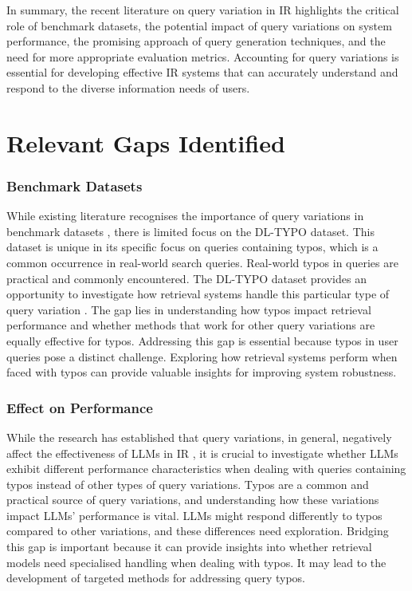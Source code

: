 In summary, the recent literature on query variation in IR highlights the critical role of benchmark datasets, the potential impact of query variations on system performance, the promising approach of query generation techniques, and the need for more appropriate evaluation metrics. Accounting for query variations is essential for developing effective IR systems that can accurately understand and respond to the diverse information needs of users.

\section{Relevant Gaps Identified}
\subsubsection{Benchmark Datasets}
While existing literature recognises the importance of query variations in benchmark datasets \cite{penha2022, zendel, lu}, there is limited focus on the DL-TYPO dataset. This dataset is unique in its specific focus on queries containing typos, which is a common occurrence in real-world search queries.
Real-world typos in queries are practical and commonly encountered. The DL-TYPO dataset provides an opportunity to investigate how retrieval systems handle this particular type of query variation \cite{characterbert}. The gap lies in understanding how typos impact retrieval performance and whether methods that work for other query variations are equally effective for typos.
Addressing this gap is essential because typos in user queries pose a distinct challenge. Exploring how retrieval systems perform when faced with typos can provide valuable insights for improving system robustness.

\subsubsection{Effect on Performance}
While the research has established that query variations, in general, negatively affect the effectiveness of LLMs in IR \cite{penha2022, zuccon, ribeiro}, it is crucial to investigate whether LLMs exhibit different performance characteristics when dealing with queries containing typos instead of other types of query variations.
Typos are a common and practical source of query variations, and understanding how these variations impact LLMs' performance is vital. LLMs might respond differently to typos compared to other variations, and these differences need exploration.
Bridging this gap is important because it can provide insights into whether retrieval models need specialised handling when dealing with typos. It may lead to the development of targeted methods for addressing query typos.

